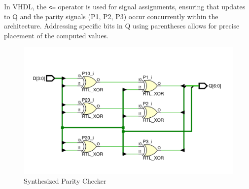 \documentclass[12pt]{article}
\begin{document}
In VHDL, the \texttt{<=} operator is used for signal assignments, ensuring that updates
to Q and the parity signals (P1, P2, P3) occur concurrently within the
architecture. Addressing specific bits in Q using parentheses allows for
precise placement of the computed values.
\begin{figure}[H]
	\centering
	\includegraphics[scale=.55]{examp121}
	\caption{Synthesized Parity Checker}
\end{figure}
\end{document}
